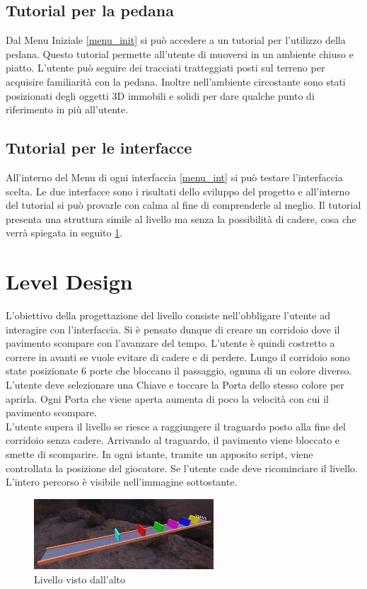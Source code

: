 \documentclass[target=bach,aauheader=]{thud}
\begin{document}
\subsection{Tutorial per la pedana}
\label{tut_ped}
Dal Menu Iniziale \ref{menu_init} si può accedere a un tutorial per l'utilizzo della pedana.
Questo tutorial permette all'utente di muoversi in un ambiente chiuso e piatto.
L'utente può seguire dei tracciati tratteggiati posti sul terreno per acquisire familiarità con la pedana.
Inoltre nell'ambiente circostante sono stati posizionati degli oggetti 3D immobili e solidi per dare qualche punto di riferimento in più all'utente. 

\subsection{Tutorial per le interfacce}
\label{tut_int}
All'interno del Menu di ogni interfaccia \ref{menu_int} si può testare l'interfaccia scelta.
Le due interfacce sono i risultati dello sviluppo del progetto e all'interno del tutorial si può provarle con calma al fine di comprenderle al meglio.
Il tutorial presenta una struttura simile al livello ma senza la possibilità di cadere, cosa che verrà spiegata in seguito \ref{level}. 

\section{Level Design}
\label{level}
L'obiettivo della progettazione del livello consiste nell'obbligare l'utente ad interagire con l'interfaccia.
Si è pensato dunque di creare un corridoio dove il pavimento scompare con l'avanzare del tempo.
L'utente è quindi costretto a correre in avanti se vuole evitare di cadere e di perdere.
Lungo il corridoio sono state posizionate 6 porte che bloccano il passaggio, ognuna di un colore diverso.
L'utente deve selezionare una Chiave e toccare la Porta dello stesso colore per aprirla.
Ogni Porta che viene aperta aumenta di poco la velocità con cui il pavimento scompare. \\

L'utente supera il livello se riesce a raggiungere il traguardo posto alla fine del corridoio senza cadere.
Arrivando al traguardo, il pavimento viene bloccato e smette di scomparire.
In ogni istante, tramite un apposito script, viene controllata la posizione del giocatore.
Se l'utente cade deve ricominciare il livello.
L'intero percorso è visibile nell'immagine sottostante.

\begin{figure}[h]
    \centering
    \includegraphics[width=0.60\textwidth]{level}
    \caption{Livello visto dall'alto}
    \label{fig:level}
\end{figure}
\end{document}
